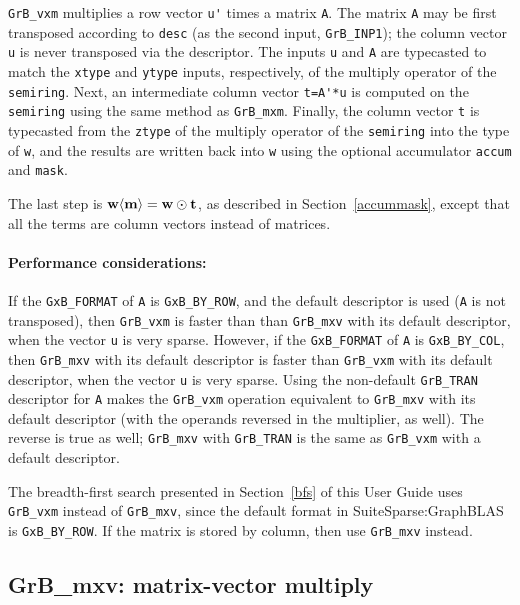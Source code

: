 \documentclass[12pt]{article}
\begin{document}
\verb'GrB_vxm' multiplies a row vector \verb"u'" times a matrix \verb'A'.  The
matrix \verb'A' may be first transposed according to \verb'desc' (as the second
input, \verb'GrB_INP1'); the column vector \verb'u' is never transposed via the
descriptor.  The inputs \verb'u' and \verb'A' are typecasted to match the
\verb'xtype' and \verb'ytype' inputs, respectively, of the multiply operator of
the \verb'semiring'.  Next, an intermediate column vector \verb"t=A'*u" is
computed on the \verb'semiring' using the same method as \verb'GrB_mxm'.
Finally, the column vector \verb't' is typecasted from the \verb'ztype' of the
multiply operator of the \verb'semiring' into the type of \verb'w', and the
results are written back into \verb'w' using the optional accumulator
\verb'accum' and \verb'mask'.

The last step is ${\bf w \langle m \rangle  = w \odot t}$, as described
in Section~\ref{accummask}, except that all the
terms are column vectors instead of matrices.

\paragraph{\bf Performance considerations:} %
If the \verb'GxB_FORMAT' of \verb'A' is \verb'GxB_BY_ROW', and the default
descriptor is used (\verb'A' is not transposed), then \verb'GrB_vxm' is faster
than than \verb'GrB_mxv' with its default descriptor, when the vector \verb'u'
is very sparse.
However, if the \verb'GxB_FORMAT' of \verb'A' is \verb'GxB_BY_COL', then
\verb'GrB_mxv' with its default descriptor is faster than \verb'GrB_vxm' with
its default descriptor, when the vector \verb'u' is very sparse.
Using the non-default \verb'GrB_TRAN' descriptor for \verb'A' makes the
\verb'GrB_vxm' operation equivalent to \verb'GrB_mxv' with its default
descriptor (with the operands reversed in the multiplier, as well).  The
reverse is true as well; \verb'GrB_mxv' with \verb'GrB_TRAN' is the same as
\verb'GrB_vxm' with a default descriptor.

The breadth-first search presented in Section~\ref{bfs} of this User Guide uses
\verb'GrB_vxm' instead of \verb'GrB_mxv', since the default format in
SuiteSparse:GraphBLAS is \verb'GxB_BY_ROW'.  If the matrix is stored by column,
then use \verb'GrB_mxv' instead.

\newpage
\subsection{{\sf GrB\_mxv:} matrix-vector multiply} %
\label{mxv}
\end{document}
